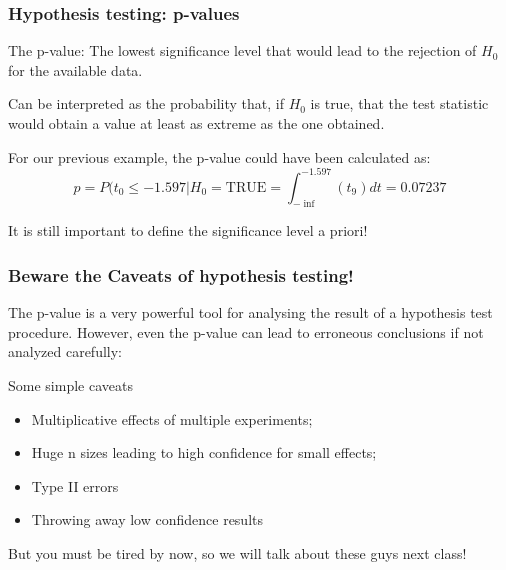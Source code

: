 \documentclass[10pt]{beamer}
\begin{document}
\begin{frame}
  \frametitle{Hypothesis testing: p-values}
  \begin{block}{The p-value:}
    The lowest significance level that would lead to the rejection of
    $H_0$ for the available data.
  \end{block}
  
  \bigskip
  
  Can be interpreted as the probability that, if $H_0$ is true, that
  the test statistic would obtain a value at least as extreme as the
  one obtained.

  \bigskip

  For our previous example, the p-value could have been calculated as:
  \begin{equation*}
    p = P(t_0 \leq -1.597|H_0 = \text{TRUE} =
    \int^{-1.597}_{-\inf}(t_9)dt = 0.07237
  \end{equation*}

  \bigskip
  
  \begin{block}{}
    It is still important to define the significance level a priori!
  \end{block}
\end{frame}

\begin{frame}
  \frametitle{Beware the Caveats of hypothesis testing!}

  The p-value is a very powerful tool for analysing the result of a
  hypothesis test procedure. However, even the p-value can lead
  to erroneous conclusions if not analyzed carefully:

  \bigskip

  \begin{block}{Some simple caveats}
    \begin{itemize}
    \item Multiplicative effects of multiple experiments;
    \item Huge n sizes leading to high confidence for small effects;
    \item Type II errors
    \item Throwing away low confidence results
    \end{itemize}
  \end{block}

  \bigskip

  But you must be tired by now, so we will talk about these guys next
  class!
\end{frame}
\end{document}
